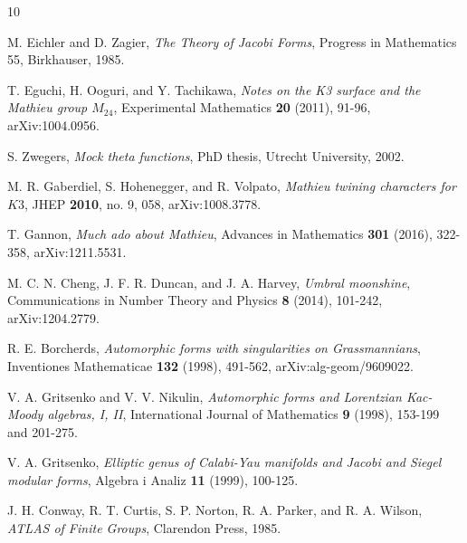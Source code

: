 \documentclass[11pt]{article}
\begin{document}
\begin{thebibliography}{10}

M. Eichler and D. Zagier, \emph{The Theory of Jacobi Forms},
Progress in Mathematics 55, Birkhauser, 1985.

T. Eguchi, H. Ooguri, and Y. Tachikawa, \emph{Notes on the K3 surface
and the Mathieu group $M_{24}$}, Experimental Mathematics \textbf{20}
(2011), 91-96, arXiv:1004.0956.

S. Zwegers, \emph{Mock theta functions}, PhD thesis, Utrecht
University, 2002.

M. R. Gaberdiel, S. Hohenegger, and R. Volpato, \emph{Mathieu
twining characters for $K3$}, JHEP \textbf{2010}, no. 9, 058,
arXiv:1008.3778.

T. Gannon, \emph{Much ado about Mathieu}, Advances in Mathematics
\textbf{301} (2016), 322-358, arXiv:1211.5531.

M. C. N. Cheng, J. F. R. Duncan, and J. A. Harvey, \emph{Umbral
moonshine}, Communications in Number Theory and Physics \textbf{8}
(2014), 101-242, arXiv:1204.2779.

R. E. Borcherds, \emph{Automorphic forms with singularities on
Grassmannians}, Inventiones Mathematicae \textbf{132} (1998), 491-562,
arXiv:alg-geom/9609022.

V. A. Gritsenko and V. V. Nikulin, \emph{Automorphic forms and
Lorentzian Kac-Moody algebras, I, II}, International Journal of
Mathematics \textbf{9} (1998), 153-199 and 201-275.

V. A. Gritsenko, \emph{Elliptic genus of Calabi-Yau manifolds and
Jacobi and Siegel modular forms}, Algebra i Analiz \textbf{11} (1999),
100-125.

J. H. Conway, R. T. Curtis, S. P. Norton, R. A. Parker, and
R. A. Wilson, \emph{ATLAS of Finite Groups}, Clarendon Press, 1985.

\end{thebibliography}
\end{document}

